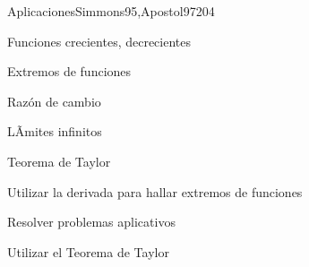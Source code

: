 \begin{syllabus}
\begin{unit}{Aplicaciones}{Simmons95,Apostol97}{20}{4}
   \begin{topics}
      \item Funciones crecientes, decrecientes
      \item Extremos de funciones
      \item Razón de cambio
      \item LÃ­mites infinitos
      \item Teorema de Taylor
   \end{topics}

   \begin{unitgoals}
      \item Utilizar la derivada para hallar extremos de funciones
      \item Resolver problemas aplicativos
      \item Utilizar el Teorema de Taylor
      \end{unitgoals}
\end{unit}



\begin{coursebibliography}
\end{coursebibliography}

\end{syllabus}
